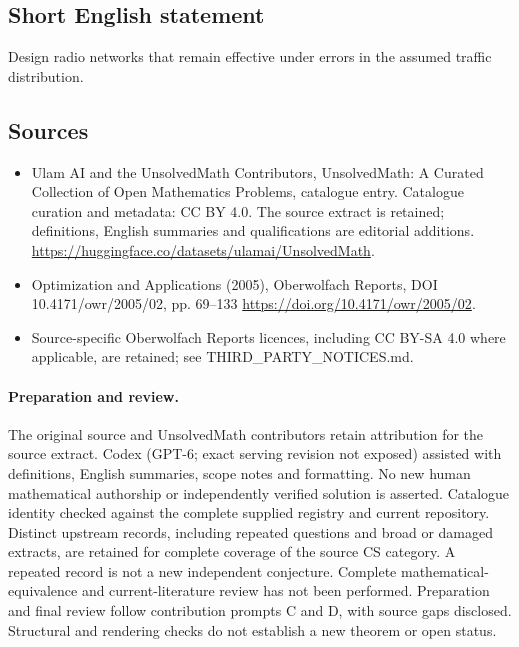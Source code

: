 \documentclass[11pt]{article}
\begin{document}
\subsection{Short English statement}
Design radio networks that remain effective under errors in the assumed traffic distribution.
\subsection{Sources}
\begin{itemize}
\item[\hypertarget{source:statement:1}{S1}] Ulam AI and the UnsolvedMath Contributors, UnsolvedMath: A Curated Collection of Open Mathematics Problems, catalogue entry. Catalogue curation and metadata: CC BY 4.0. The source extract is retained; definitions, English summaries and qualifications are editorial additions.
\url{https://huggingface.co/datasets/ulamai/UnsolvedMath}.
\item[\hypertarget{source:statement:2}{S2}] Optimization and Applications (2005), Oberwolfach Reports, DOI 10.4171/owr/2005/02, pp. 69--133
\url{https://doi.org/10.4171/owr/2005/02}.
\item Source-specific Oberwolfach Reports licences, including CC BY-SA 4.0 where applicable, are retained; see THIRD\_PARTY\_NOTICES.md.
\end{itemize}
\paragraph{Preparation and review.}
The original source and UnsolvedMath contributors retain attribution for the source extract. Codex (GPT-6; exact serving revision not exposed) assisted with definitions, English summaries, scope notes and formatting. No new human mathematical authorship or independently verified solution is asserted. Catalogue identity checked against the complete supplied registry and current repository. Distinct upstream records, including repeated questions and broad or damaged extracts, are retained for complete coverage of the source CS category. A repeated record is not a new independent conjecture. Complete mathematical-equivalence and current-literature review has not been performed. Preparation and final review follow contribution prompts C and D, with source gaps disclosed. Structural and rendering checks do not establish a new theorem or open status.
\label{end:statement}
\end{document}
